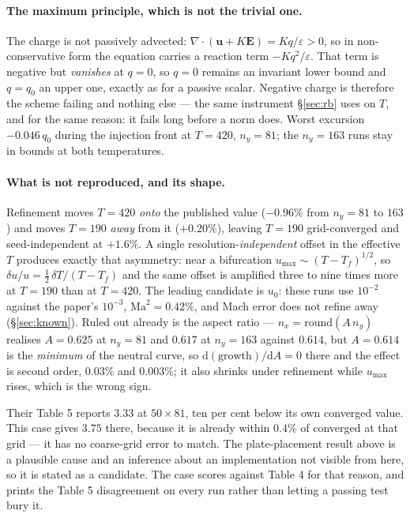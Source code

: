 \documentclass[11pt,a4paper]{article}
\newcommand{\uu}{\bm{u}}
\begin{document}
\paragraph{The maximum principle, which is not the trivial one.} The charge is
not passively advected: $\nabla\!\cdot\!(\uu+K\bm{E}) = Kq/\varepsilon > 0$, so in
non-conservative form the equation carries a reaction term $-Kq^2/\varepsilon$.
That term is negative but \emph{vanishes} at $q=0$, so $q=0$ remains an invariant
lower bound and $q=q_0$ an upper one, exactly as for a passive scalar. Negative
charge is therefore the scheme failing and nothing else --- the same instrument
\S\ref{sec:rb} uses on $T$, and for the same reason: it fails long before a
norm does. Worst excursion $-0.046\,q_0$ during the injection front at $T=420$,
$n_y=81$; the $n_y=163$ runs stay in bounds at both temperatures.

\paragraph{What is not reproduced, and its shape.} Refinement moves $T=420$
\emph{onto} the published value ($-0.96\%$ from $n_y=81$ to $163$) and moves
$T=190$ \emph{away} from it ($+0.20\%$), leaving $T=190$ grid-converged and
seed-independent at $+1.6\%$. A single resolution-\emph{independent} offset in
the effective $T$ produces exactly that asymmetry: near a bifurcation
$u_{\max}\sim(T-T_f)^{1/2}$, so $\delta u/u = \tfrac12\,\delta T/(T-T_f)$ and the
same offset is amplified three to nine times more at $T=190$ than at $T=420$.
The leading candidate is $u_0$: these runs use $10^{-2}$ against the paper's
$10^{-3}$, $\mathrm{Ma}^2=0.42\%$, and Mach error does not refine away
(\S\ref{sec:known}). Ruled out already is the aspect ratio --- $n_x=\mathrm{round}
(A\,n_y)$ realises $A=0.625$ at $n_y=81$ and $0.617$ at $n_y=163$ against
$0.614$, but $A=0.614$ is the \emph{minimum} of the neutral curve, so
$\mathrm{d}(\text{growth})/\mathrm{d}A=0$ there and the effect is second order,
$0.03\%$ and $0.003\%$; it also shrinks under refinement while $u_{\max}$ rises,
which is the wrong sign.

Their Table 5 reports $3.33$ at $50\times81$, ten per cent below its own
converged value. This case gives $3.75$ there, because it is already within
$0.4\%$ of converged at that grid --- it has no coarse-grid error to match. The
plate-placement result above is a plausible cause and an inference about an
implementation not visible from here, so it is stated as a candidate. The case
scores against Table 4 for that reason, and prints the Table 5 disagreement on
every run rather than letting a passing test bury it.
\end{document}
